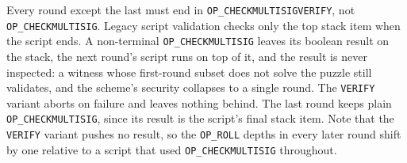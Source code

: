 \documentclass[11pt, a4paper]{article}
\begin{document}
Every round except the last must end in \texttt{OP\_CHECKMULTISIGVERIFY}, not \texttt{OP\_CHECKMULTISIG}. Legacy script validation checks only the top stack item when the script ends. A non-terminal \texttt{OP\_CHECKMULTISIG} leaves its boolean result on the stack, the next round's script runs on top of it, and the result is never inspected: a witness whose first-round subset does not solve the puzzle still validates, and the scheme's security collapses to a single round. The \texttt{VERIFY} variant aborts on failure and leaves nothing behind. The last round keeps plain \texttt{OP\_CHECKMULTISIG}, since its result is the script's final stack item. Note that the \texttt{VERIFY} variant pushes no result, so the \texttt{OP\_ROLL} depths in every later round shift by one relative to a script that used \texttt{OP\_CHECKMULTISIG} throughout.
\end{document}
